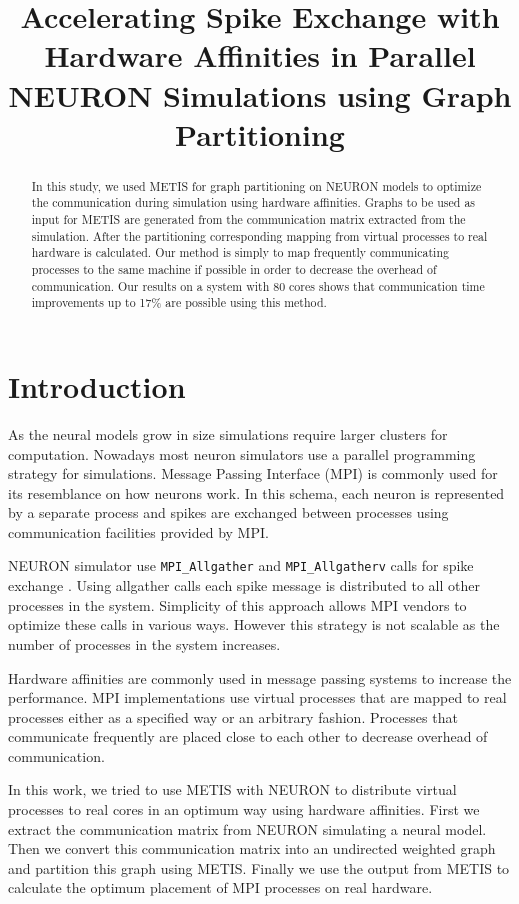 \documentclass{article}
\title{Accelerating Spike Exchange with Hardware Affinities in Parallel NEURON Simulations using Graph Partitioning}
\begin{document}
\maketitle

\begin{abstract}
In this study, we used METIS for graph partitioning on NEURON models to optimize the communication during simulation using hardware affinities.
Graphs to be used as input for METIS are generated from the communication matrix extracted from the simulation.
After the partitioning corresponding mapping from virtual processes to real hardware is calculated.
Our method is simply to map frequently communicating processes to the same machine if possible in order to decrease the overhead of communication.
Our results on a system with 80 cores shows that communication time improvements up to 17\% are possible using this method.
\end{abstract}

\section{Introduction}
\label{sec:introduction}

As the neural models grow in size simulations require larger clusters for computation.
Nowadays most neuron simulators use a parallel programming strategy for simulations.
Message Passing Interface (MPI) is commonly used for its resemblance on how neurons work.
In this schema, each neuron is represented by a separate process and spikes are exchanged between processes using communication facilities provided by MPI.

NEURON simulator use \texttt{MPI\_Allgather} and \texttt{MPI\_Allgatherv} calls for spike exchange \cite{migliore_parallel_2006}.
Using allgather calls each spike message is distributed to all other processes in the system.
Simplicity of this approach allows MPI vendors to optimize these calls in various ways.
However this strategy is not scalable as the number of processes in the system increases.

Hardware affinities are commonly used in message passing systems to increase the performance.
MPI implementations use virtual processes that are mapped to real processes either as a specified way or an arbitrary fashion.
Processes that communicate frequently are placed close to each other to decrease overhead of communication.

In this work, we tried to use METIS with NEURON to distribute virtual processes to real cores in an optimum way using hardware affinities.
First we extract the communication matrix from NEURON simulating a neural model.
Then we convert this communication matrix into an undirected weighted graph and partition this graph using METIS.
Finally we use the output from METIS to calculate the optimum placement of MPI processes on real hardware.
\end{document}
